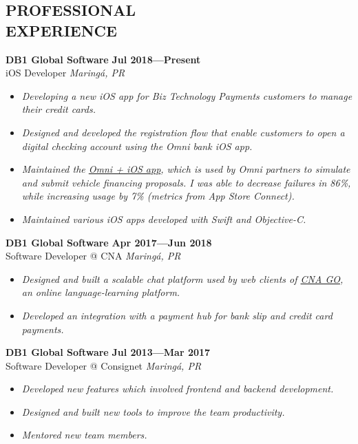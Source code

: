 \documentclass[line,margin]{res}
\begin{document}


\address{\sl \href{https://marcosatanaka.com}{marcosatanaka.com} --- \href{mailto:marcosatanaka@gmail.com}{marcosatanaka@gmail.com}}


\begin{resume}


\section{PROFESSIONAL \\ EXPERIENCE}
  {\bf DB1 Global Software} \hfill {\bf Jul 2018---Present} \\
  iOS Developer \hfill {\sl Maring\'a, PR}\\[-6pt]
  \begin{itemize}
      \item {\sl Developing a new iOS app for Biz Technology Payments customers to manage their credit cards.}
    \item {\sl Designed and developed the registration flow that enable customers to open a digital checking account using the Omni bank iOS app.}
    \item {\sl Maintained the \href{https://apps.apple.com/br/app/omni/id1276332750}{Omni + iOS app}, which is used by Omni partners to simulate and submit vehicle financing proposals. I was able to decrease failures in 86\%, while increasing usage by 7\% (metrics from App Store Connect).}
    \item {\sl Maintained various iOS apps developed with Swift and Objective-C.}
  \end{itemize}

  {\bf DB1 Global Software} \hfill {\bf Apr 2017---Jun 2018} \\
  Software Developer @ CNA \hfill {\sl Maring\'a, PR}\\[-6pt]
  \begin{itemize}
    \item {\sl Designed and built a scalable chat platform used by web clients of \href{https://www.cnago.com.br}{CNA GO}, an online language-learning platform.}
    \item {\sl Developed an integration with a payment hub for
               bank slip and credit card payments.}
  \end{itemize}

  {\bf DB1 Global Software} \hfill {\bf Jul 2013---Mar 2017} \\
  Software Developer @ Consignet \hfill {\sl Maring\'a, PR}\\[-6pt]
  \begin{itemize}
    \item {\sl Developed new features which involved
               frontend and backend development.}
    \item {\sl Designed and built new tools to improve the team productivity.}
    \item {\sl Mentored new team members.}
  \end{itemize}


\end{resume}
\end{document}
